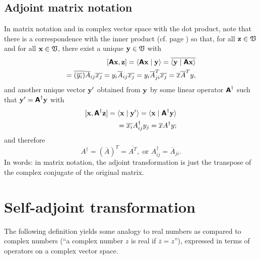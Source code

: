 \subsection{Adjoint matrix notation}

In matrix notation and in complex vector space with the dot product,
note that there is a correspondence with the inner product
(cf. page \pageref{2011-m-corr-bil-ip})
so that, for all ${\bf z}\in {\frak V}$ and for all ${\bf x}\in {\frak V}$,
 there exist a unique ${\bf y}\in {\frak V}$ with
\begin{equation}
\begin{split}
[\textsf{\textbf{A}}{\bf x}, {\bf z}] =\langle \textsf{\textbf{A}} {\bf x}\mid {\bf y}\rangle
=\overline{ \langle{\bf y}\mid \textsf{\textbf{A}} {\bf x}\rangle }   \\
 = \overline{ \left( \overline{ y_i} \right) } \overline{ A}_{ij} \overline{ x_j}   = y_i\overline{ A}_{ij} \overline{ x_j}
 = y_i\overline{ A}_{ji}^T \overline{ x_j }    = \overline{ x }\overline{ A}^T y,
\end{split}
\end{equation}
and another unique vector ${\bf y}'$ obtained from ${\bf y}$ by
some linear operator $\textsf{\textbf{A}}^\dagger$
such that ${\bf y}'=\textsf{\textbf{A}}^\dagger {\bf y}$ with
\begin{equation}
\begin{split}
[{\bf x}, \textsf{\textbf{A}}^\dagger {\bf z}] =
\langle {\bf x}\mid {\bf y}'\rangle         =
\langle {\bf x}\mid \textsf{\textbf{A}}^\dagger {\bf y}\rangle        \\
 = \overline{ x_i } A_{ij}^\dagger y_j      =   \overline{ x }A ^\dagger y;
\end{split}
\end{equation}
and therefore
\begin{equation}
A ^\dagger =(\overline{ A})^T =\overline{ A^T}, \textrm{ or } A^\dagger_{ij}=\overline{A}_{ji} .
\end{equation}
In words: in matrix notation, the adjoint transformation is just the
transpose of the complex conjugate of the original matrix.

\section{Self-adjoint transformation}
\label{2015-m-ch-fdlvs-self-adjoint}



The following definition yields some analogy to real numbers as compared to complex numbers
(``a complex number $z$ is real if $\overline{z}=z$''),
expressed in terms of operators on a complex vector space.


